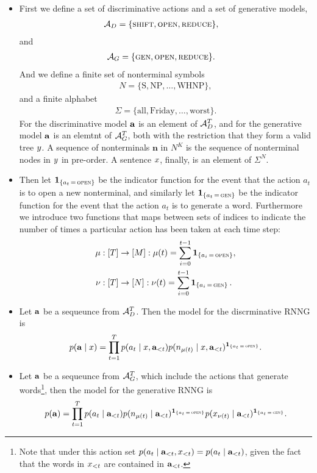 \begin{itemize}
  \item First we define a set of discriminative actions and a set of generative models,
  \begin{align}
    \mathcal{A}_D &= \{ \textsc{shift}, \textsc{open}, \textsc{reduce} \},
  \end{align}
  and
  \begin{align}
    \mathcal{A}_G &= \{ \textsc{gen}, \textsc{open}, \textsc{reduce} \}.
  \end{align}
  And we define a finite set of nonterminal symbols
  \begin{align*}
    N = \{ \text{S}, \text{NP}, \dots, \text{WHNP}\},
  \end{align*}
  and a finite alphabet
  \begin{align*}
    \Sigma = \{ \text{all}, \text{Friday}, \dots, \text{worst} \}.
  \end{align*}
  For the discriminative model $\mathbf{a}$ is an element of $\mathcal{A}_D^T$, and for the generative model $\mathbf{a}$ is an elemtnt of $\mathcal{A}_G^T$, both with the restriction that they form a valid tree $y$. A sequence of nonterminals $\mathbf{n}$ in $N^K$ is the sequence of nonterminal nodes in $y$ in pre-order. A sentence $x$, finally, is an element of $\Sigma^N$.

  \item Then let $\operatorname{\mathbf{1}}_{ \{ a_t \, = \, \textsc{open} \} }$ be the indicator function for the event that the action $a_t$ is to open a new nonterminal, and similarly let $\operatorname{\mathbf{1}}_{ \{ a_t \, = \, \textsc{gen} \} }$ be the indicator function for the event that the action $a_t$ is to generate a word. Furthermore we introduce two functions that maps between sets of indices to indicate the number of times a particular action has been taken at each time step:
  \begin{align*}
    \mu &: [ T ] \to [ M ]: \mu(t) = \sum_{i=0}^{t-1} \operatorname{\mathbf{1}}_{ \{ a_i \, = \, \textsc{open} \} },  \\
    \nu &: [ T ] \to [ N ]: \nu(t) = \sum_{i=0}^{t-1} \operatorname{\mathbf{1}}_{ \{ a_i \, = \, \textsc{gen} \} }.
  \end{align*}

  \item Let $\mathbf{a}$ be a sequeunce from $\mathcal{A}_D^T$. Then the model for the discrminative RNNG is
  \begin{align}
    \label{eq:disc-model}
    p(\mathbf{a} \mid x) = \prod_{t=1}^T p(a_t \mid x, \mathbf{a}_{<t}) p(n_{\mu(t)} \mid x, \mathbf{a}_{<t} )^{ \operatorname{\mathbf{1}}_{ \{ a_t \, = \, \textsc{open} \} } }.
  \end{align}
  \item Let $\mathbf{a}$ be a sequeunce from $\mathcal{A}_G^T$, which include the actions that generate words\footnote{Note that under this action set $p(a_t \mid \mathbf{a}_{<t}, x_{<t}) = p(a_t \mid \mathbf{a}_{<t})$, given the fact that the words in $x_{<t}$ are contained in $\mathbf{a}_{<t}$.}, then the model for the generative RNNG is
  \begin{align}
    \label{eq:gen-model}
    p(\mathbf{a}) = \prod_{t=1}^T p(a_t \mid \mathbf{a}_{<t}) p(n_{\mu(t)} \mid   \mathbf{a}_{<t})^{ \operatorname{\mathbf{1}}_{ \{ a_t \, = \, \textsc{open} \} } } p(x_{\nu(t)} \mid \mathbf{a}_{<t})^{ \operatorname{\mathbf{1}}_{ \{ a_t \, = \, \textsc{gen} \} } }.
  \end{align}


\end{itemize}
